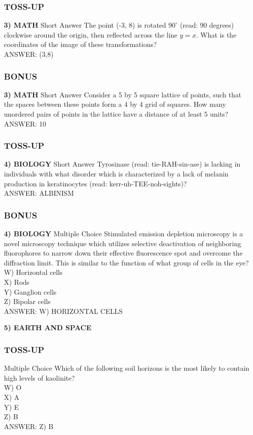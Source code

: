 \newpage

\subsubsection*{TOSS-UP}
\textbf{3) MATH}
Short Answer The point (-3, 8) is rotated $90^{\circ}$ (read: 90 degrees) clockwise around the origin, then reflected across the line $y=x.$ What is the coordinates of the image of these transformations?
\\ANSWER: (3,8)

\subsubsection*{BONUS}
\textbf{3) MATH}
Short Answer Consider a 5 by 5 square lattice of points, such that the spaces between these points form a 4 by 4 grid of squares. How many unordered pairs of points in the lattice have a distance of at least 5 units?
\\ANSWER: 10

\subsubsection*{TOSS-UP}
\textbf{4) BIOLOGY}
Short Answer Tyrosinase (read: tie-RAH-sin-ase) is lacking in individuals with what disorder which is characterized by a lack of melanin production in keratinocytes (read: kerr-uh-TEE-noh-sights)?
\\ANSWER: ALBINISM

\subsubsection*{BONUS}
\textbf{4) BIOLOGY}
Multiple Choice Stimulated emission depletion microscopy is a novel microscopy technique which utilizes selective deactivation of neighboring fluorophores to narrow down their effective fluorescence spot and overcome the diffraction limit. This is similar to the function of what group of cells in the eye?
\\W) Horizontal cells
\\X) Rods
\\Y) Ganglion cells
\\Z) Bipolar cells
\\ANSWER: W) HORIZONTAL CELLS

\newpage

\textbf{5) EARTH AND SPACE}
\subsubsection*{TOSS-UP}
Multiple Choice Which of the following soil horizons is the most likely to contain high levels of kaolinite?
\\W) O
\\X) A
\\Y) E
\\Z) B
\\ANSWER: Z) B

